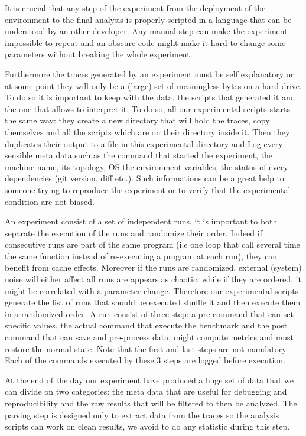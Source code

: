 It is crucial that any step of the experiment from the deployment of the
environment to the final analysis is properly scripted in a language that can
be understood by an other developer. Any manual step can make the experiment
impossible to repeat and an obscure code might make it hard to change some
parameters without breaking the whole experiment.

Furthermore the traces generated by an experiment must be self explanatory or
at some point they will only be a (large) set of meaningless bytes on a hard
drive. To do so it is important to keep with the data, the scripts
that generated it and the one that allows to interpret it. To do so, all our
experimental scripts starts the same way: they create a new directory that
will hold the traces, copy themselves and all the scripts which are on their
directory inside it. Then they duplicates their output to a file in this
experimental directory and Log every sensible meta data such as the
command that started the experiment, the machine name, its topology, \gls{OS}
the environment variables, the status of every dependencies (git version, diff
etc.). Such informations can be a great help to someone trying to reproduce
the experiment or to verify that the experimental condition are not biased.

An experiment consist of a set of independent runs, it is important to both
separate the execution of the runs and randomize their order. Indeed if
consecutive runs are part of the same program (i.e one loop that call several
time the same function instead of re-executing a program at each run), they
can benefit from cache effects. Moreover if the runs are randomized, external
(system) noise will either affect all runs are appears as chaotic, while if
they are ordered, it might be correlated with a parameter change.
Therefore our experimental scripts generate the list of runs that should be
executed shuffle it and then execute them in a randomized order. A run
consist of three step: a pre command that can set specific values,
the actual command that execute the benchmark and the post command that can
save and pre-process data, might compute metrics and must restore the normal state. Note that
the first and last steps are not mandatory. Each of the commands executed by
these 3 steps are logged before execution.

At the end of the day our experiment have produced a huge set of data that we
can divide on two categories: the meta data that are useful for debugging and
reproducibility and the raw results that will be filtered to then be analyzed.
The parsing step is designed only to extract data from the traces so the
analysis scripts can work on clean results, we avoid to do any statistic
during this step.

